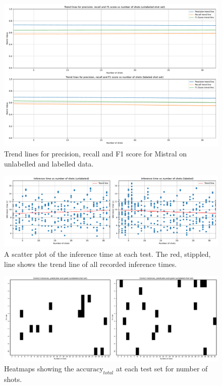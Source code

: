 \begin{figure}[h]
    \centering
    \includegraphics[width=\textwidth]{figures/ul_trend_lines.pdf}
    \caption[Mistral all metrics trend lines]{Trend lines for precision, recall and F1 score for Mistral on unlabelled and labelled data.}
    \label{fig:mistral_trend_lines}
\end{figure}

\begin{figure}[h]
    \centering
    \includegraphics[width=\textwidth]{figures/ul_inf_time.pdf}
    \caption[Mistral inference time]{A scatter plot of the inference time at each test. The red, stippled, line shows the trend line of all recorded inference times.}
    \label{fig:mistral_inf_time}
\end{figure}

\begin{figure}[h]
    \centering
    \includegraphics[width=\textwidth]{figures/ul_heatmaps.pdf}
    \caption[Mistral $\text{accuracy}_{total}$ heatmaps]{Heatmaps showing the $\text{accuracy}_{total}$ at each test set for number of shots.}
    \label{fig:mistral_heatmaps}
\end{figure}


